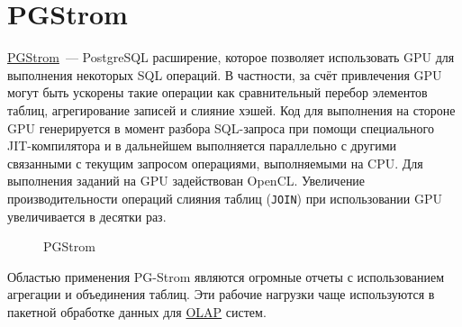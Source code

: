 \section{PGStrom}

\href{http://strom.kaigai.gr.jp/}{PGStrom}~--- PostgreSQL расширение, которое позволяет использовать GPU для выполнения некоторых SQL операций. В частности, за счёт привлечения GPU могут быть ускорены такие операции как сравнительный перебор элементов таблиц, агрегирование записей и слияние хэшей. Код для выполнения на стороне GPU генерируется в момент разбора SQL-запроса при помощи специального JIT-компилятора и в дальнейшем выполняется параллельно с другими связанными с текущим запросом операциями, выполняемыми на CPU. Для выполнения заданий на GPU задействован OpenCL. Увеличение производительности операций слияния таблиц (\lstinline!JOIN!) при использовании GPU увеличивается в десятки раз.

\begin{figure}[ht!]
  \caption{PGStrom}
  \label{fig:pgstrom1}
\end{figure}

Областью применения PG-Strom являются огромные отчеты с использованием агрегации и объединения таблиц. Эти рабочие нагрузки чаще используются в пакетной обработке данных для \href{https://ru.wikipedia.org/wiki/OLAP}{OLAP} систем.
